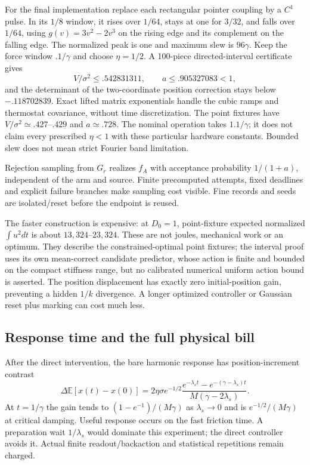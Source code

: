 \documentclass[11pt,a4paper]{article}
\newcommand{\E}{\mathbb E}\newcommand{\Prb}{\mathbb P}
\begin{document}
For the final implementation replace each rectangular pointer coupling by a $C^1$ pulse. In its $1/8$ window, it rises over $1/64$, stays at one for $3/32$, and falls over $1/64$, using $g(v)=3v^2-2v^3$ on the rising edge and its complement on the falling edge. The normalized peak is one and maximum slew is $96\gamma$. Keep the force window $.1/\gamma$ and choose $\eta=1/2$. A 100-piece directed-interval certificate gives
\[
 V/\sigma^2\le.542831311,\qquad a\le.905327083<1,
\]
and the determinant of the two-coordinate position correction stays below $-.118702839$. Exact lifted matrix exponentials handle the cubic ramps and thermostat covariance, without time discretization. The point fixtures have $V/\sigma^2\simeq.427$--$.429$ and $a\simeq.728$. The nominal operation takes $1.1/\gamma$; it does not claim every prescribed $\eta<1$ with these particular hardware constants. Bounded slew does not mean strict Fourier band limitation.

Rejection sampling from $G_r$ realizes $f_A$ with acceptance probability $1/(1+a)$, independent of the arm and source. Finite precomputed attempts, fixed deadlines and explicit failure branches make sampling cost visible. Fine records and seeds are isolated/reset before the endpoint is reused.

The faster construction is expensive: at $D_0=1$, point-fixture expected normalized $\int u^2dt$ is about $13{,}324$--$23{,}324$. These are not joules, mechanical work or an optimum. They describe the constrained-optimal point fixtures; the interval proof uses its own mean-correct candidate predictor, whose action is finite and bounded on the compact stiffness range, but no calibrated numerical uniform action bound is asserted. The position displacement has exactly zero initial-position gain, preventing a hidden $1/k$ divergence. A longer optimized controller or Gaussian reset plus marking can cost much less.

\subsection{Response time and the full physical bill}
After the direct intervention, the bare harmonic response has position-increment contrast
\[
 \Delta\E[x(t)-x(0)]
 =2\eta\sigma e^{-1/2}
 \frac{e^{-\lambda_st}-e^{-(\gamma-\lambda_s)t}}
 {M(\gamma-2\lambda_s)}.
\]
At $t=1/\gamma$ the gain tends to $(1-e^{-1})/(M\gamma)$ as $\lambda_s\to0$ and is $e^{-1/2}/(M\gamma)$ at critical damping. Useful response occurs on the fast friction time. A preparation wait $1/\lambda_s$ would dominate this experiment; the direct controller avoids it. Actual finite readout/backaction and statistical repetitions remain charged.
\end{document}
